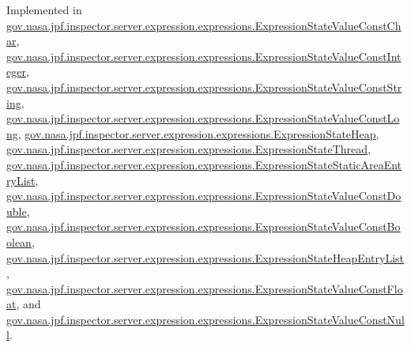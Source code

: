 Implemented in \hyperlink{classgov_1_1nasa_1_1jpf_1_1inspector_1_1server_1_1expression_1_1expressions_1_1_expression_state_value_const_char_a43f65b5bc9fe8dbbec5f8135e9a797d6}{gov.\+nasa.\+jpf.\+inspector.\+server.\+expression.\+expressions.\+Expression\+State\+Value\+Const\+Char}, \hyperlink{classgov_1_1nasa_1_1jpf_1_1inspector_1_1server_1_1expression_1_1expressions_1_1_expression_state_value_const_integer_a657bcf68c92b457f8140f9e2d11fa022}{gov.\+nasa.\+jpf.\+inspector.\+server.\+expression.\+expressions.\+Expression\+State\+Value\+Const\+Integer}, \hyperlink{classgov_1_1nasa_1_1jpf_1_1inspector_1_1server_1_1expression_1_1expressions_1_1_expression_state_value_const_string_abae7eb766144fbb9a11336bb9053ad4a}{gov.\+nasa.\+jpf.\+inspector.\+server.\+expression.\+expressions.\+Expression\+State\+Value\+Const\+String}, \hyperlink{classgov_1_1nasa_1_1jpf_1_1inspector_1_1server_1_1expression_1_1expressions_1_1_expression_state_value_const_long_a770a1cd80b919acf0a4d2b2311712fed}{gov.\+nasa.\+jpf.\+inspector.\+server.\+expression.\+expressions.\+Expression\+State\+Value\+Const\+Long}, \hyperlink{classgov_1_1nasa_1_1jpf_1_1inspector_1_1server_1_1expression_1_1expressions_1_1_expression_state_heap_af2b2515a931a0490889645440f75d2bd}{gov.\+nasa.\+jpf.\+inspector.\+server.\+expression.\+expressions.\+Expression\+State\+Heap}, \hyperlink{classgov_1_1nasa_1_1jpf_1_1inspector_1_1server_1_1expression_1_1expressions_1_1_expression_state_thread_a0ea05a0e2f04a90ec1671190dff3fc24}{gov.\+nasa.\+jpf.\+inspector.\+server.\+expression.\+expressions.\+Expression\+State\+Thread}, \hyperlink{classgov_1_1nasa_1_1jpf_1_1inspector_1_1server_1_1expression_1_1expressions_1_1_expression_state_static_area_entry_list_aca697e7e833e829577a2faba14950328}{gov.\+nasa.\+jpf.\+inspector.\+server.\+expression.\+expressions.\+Expression\+State\+Static\+Area\+Entry\+List}, \hyperlink{classgov_1_1nasa_1_1jpf_1_1inspector_1_1server_1_1expression_1_1expressions_1_1_expression_state_value_const_double_a30b2588b19408ff3bdf8b8d639eebbfe}{gov.\+nasa.\+jpf.\+inspector.\+server.\+expression.\+expressions.\+Expression\+State\+Value\+Const\+Double}, \hyperlink{classgov_1_1nasa_1_1jpf_1_1inspector_1_1server_1_1expression_1_1expressions_1_1_expression_state_value_const_boolean_add7e3fb06fbe9c355e23bf3a3195bb63}{gov.\+nasa.\+jpf.\+inspector.\+server.\+expression.\+expressions.\+Expression\+State\+Value\+Const\+Boolean}, \hyperlink{classgov_1_1nasa_1_1jpf_1_1inspector_1_1server_1_1expression_1_1expressions_1_1_expression_state_heap_entry_list_a1122f898fc0ef3bbe43f3c278a130052}{gov.\+nasa.\+jpf.\+inspector.\+server.\+expression.\+expressions.\+Expression\+State\+Heap\+Entry\+List}, \hyperlink{classgov_1_1nasa_1_1jpf_1_1inspector_1_1server_1_1expression_1_1expressions_1_1_expression_state_value_const_float_a6469a65a6c69ab78e0cacad7b62c3b1f}{gov.\+nasa.\+jpf.\+inspector.\+server.\+expression.\+expressions.\+Expression\+State\+Value\+Const\+Float}, and \hyperlink{classgov_1_1nasa_1_1jpf_1_1inspector_1_1server_1_1expression_1_1expressions_1_1_expression_state_value_const_null_a906f6d548de37552b163e2abd9d51ca4}{gov.\+nasa.\+jpf.\+inspector.\+server.\+expression.\+expressions.\+Expression\+State\+Value\+Const\+Null}.

